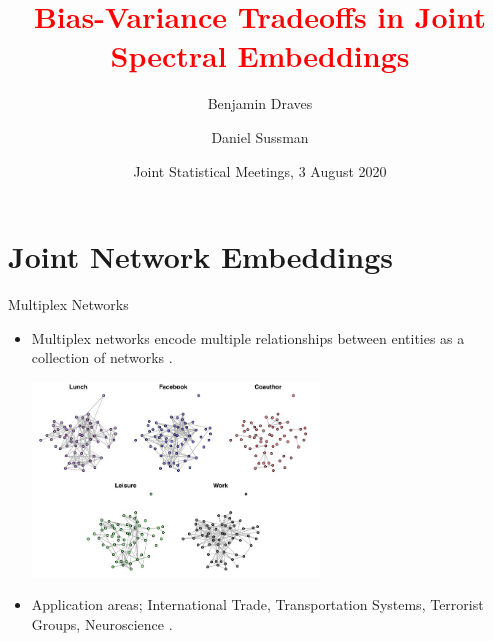 \documentclass[handout]{beamer}
\title{\textcolor{red}{Bias-Variance Tradeoffs in Joint Spectral Embeddings}}
\author[Benjamin Draves]{Benjamin Draves \and Daniel Sussman}
\institute[Boston Univeristy] 
{\normalsize Boston University}
\date{Joint Statistical Meetings, 3 August 2020}
\begin{document}
\begin{frame}
  \titlepage
\end{frame}

\section{Joint Network Embeddings}

\begin{frame}{Multiplex Networks}
\begin{itemize}
    \item Multiplex networks encode multiple relationships between entities as a collection of networks \parencite{magnani2013combinatorial}.
    \begin{center}
        \includegraphics[width=0.6\textwidth]{aarhus_multiplex.jpg}
    \end{center}\pause
    \item Application areas; International Trade, Transportation Systems, Terrorist Groups, Neuroscience \parencite{Kivela2014}. 
\end{itemize}
\end{frame}
\end{document}
